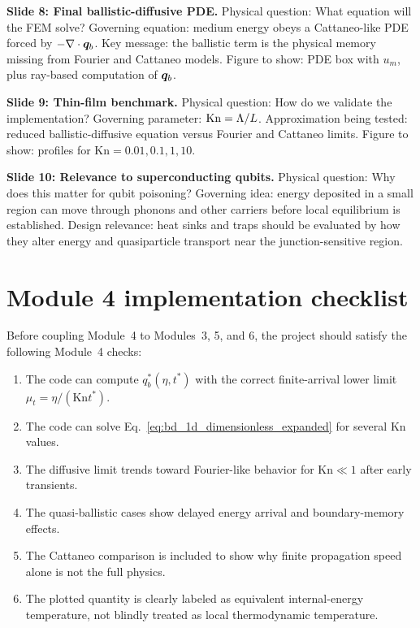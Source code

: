 \documentclass[11pt]{article}
\begin{document}
\begin{notebox}
\textbf{Slide 8: Final ballistic-diffusive PDE.}
Physical question: What equation will the FEM solve? Governing equation: medium energy obeys a Cattaneo-like PDE forced by \(-\nabla\cdot\bm{q}_b\). Key message: the ballistic term is the physical memory missing from Fourier and Cattaneo models. Figure to show: PDE box with \(u_m\), plus ray-based computation of \(\bm{q}_b\).
\end{notebox}

\begin{notebox}
\textbf{Slide 9: Thin-film benchmark.}
Physical question: How do we validate the implementation? Governing parameter: \(\mathrm{Kn}=\Lambda/L\). Approximation being tested: reduced ballistic-diffusive equation versus Fourier and Cattaneo limits. Figure to show: profiles for \(\mathrm{Kn}=0.01,0.1,1,10\).
\end{notebox}

\begin{notebox}
\textbf{Slide 10: Relevance to superconducting qubits.}
Physical question: Why does this matter for qubit poisoning? Governing idea: energy deposited in a small region can move through phonons and other carriers before local equilibrium is established. Design relevance: heat sinks and traps should be evaluated by how they alter energy and quasiparticle transport near the junction-sensitive region.
\end{notebox}

\section{Module 4 implementation checklist}
Before coupling Module~4 to Modules~3, 5, and 6, the project should satisfy the following Module~4 checks:
\begin{enumerate}[leftmargin=1.6em]
    \item The code can compute \(q_b^*(\eta,t^*)\) with the correct finite-arrival lower limit \(\mu_t=\eta/(\mathrm{Kn}t^*)\).
    \item The code can solve Eq.~\eqref{eq:bd_1d_dimensionless_expanded} for several \(\mathrm{Kn}\) values.
    \item The diffusive limit trends toward Fourier-like behavior for \(\mathrm{Kn}\ll 1\) after early transients.
    \item The quasi-ballistic cases show delayed energy arrival and boundary-memory effects.
    \item The Cattaneo comparison is included to show why finite propagation speed alone is not the full physics.
    \item The plotted quantity is clearly labeled as equivalent internal-energy temperature, not blindly treated as local thermodynamic temperature.
\end{enumerate}
\end{document}
